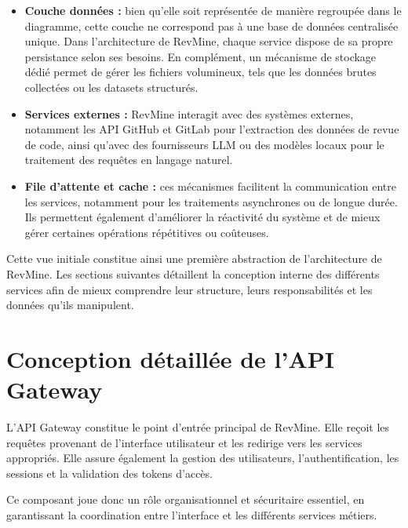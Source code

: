 \begin{itemize}
\begin{itemize}
    \end{itemize}

    \item \textbf{Couche données :} bien qu’elle soit représentée de manière regroupée dans le diagramme, cette couche ne correspond pas à une base de données centralisée unique. Dans l’architecture de RevMine, chaque service dispose de sa propre persistance selon ses besoins. En complément, un mécanisme de stockage dédié permet de gérer les fichiers volumineux, tels que les données brutes collectées ou les datasets structurés.

    \item \textbf{Services externes :} RevMine interagit avec des systèmes externes, notamment les API GitHub et GitLab pour l’extraction des données de revue de code, ainsi qu’avec des fournisseurs LLM ou des modèles locaux pour le traitement des requêtes en langage naturel.

    \item \textbf{File d’attente et cache :} ces mécanismes facilitent la communication entre les services, notamment pour les traitements asynchrones ou de longue durée. Ils permettent également d’améliorer la réactivité du système et de mieux gérer certaines opérations répétitives ou coûteuses.
\end{itemize}

Cette vue initiale constitue ainsi une première abstraction de l’architecture de RevMine. Les sections suivantes détaillent la conception interne des différents services afin de mieux comprendre leur structure, leurs responsabilités et les données qu’ils manipulent.

\section{Conception détaillée de l'API Gateway}
L’API Gateway constitue le point d’entrée principal de RevMine. Elle reçoit les requêtes provenant de l’interface utilisateur et les redirige vers les services appropriés. Elle assure également la gestion des utilisateurs, l’authentification, les sessions et la validation des tokens d’accès.

Ce composant joue donc un rôle organisationnel et sécuritaire essentiel, en garantissant la coordination entre l’interface et les différents services métiers.

